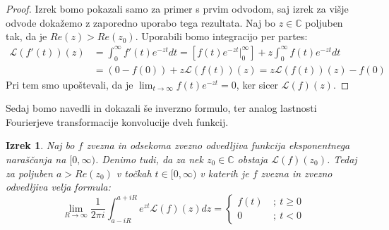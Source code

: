 \documentclass[a4paper, 10pt]{article}
\newtheorem{izr}{Izrek}
\newcommand{\mth}[1]{\ensuremath{\mathbb{#1}}}
\newcommand{\C}{\mth{C}}
\begin{document}
			\begin{proof}
				Izrek bomo pokazali samo za primer s prvim odvodom, saj izrek za višje odvode dokažemo z zaporedno uporabo tega rezultata. Naj bo $z\in\C$ poljuben tak, da je $Re(z) > Re(z_0)$. Uporabili bomo integracijo per partes: \begin{align*}
					\mathcal{L}(f'(t))(z) &= \int_{0}^{\infty}f'(t)e^{-zt}dt = [f(t)e^{-zt} \big|_{0}^{\infty}] + z\int_{0}^{\infty}f(t)e^{-zt}dt \\
					&= (0 - f(0)) + z\mathcal{L}(f(t))(z) = z\mathcal{L}(f(t))(z) - f(0)
				\end{align*}
				Pri tem smo upoštevali, da je $\lim_{t\to\infty}f(t)e^{-zt} = 0$, ker sicer $\mathcal{L}(f)(z)$.
			\end{proof}
			
			Sedaj bomo navedli in dokazali še inverzno formulo, ter analog lastnosti Fourierjeve transformacije konvolucije dveh funkcij.
			
			\begin{izr}
				\label{izr:InvLT}
				Naj bo $f$ zvezna in odsekoma zvezno odvedljiva funkcija eksponentnega naraščanja na $[0, \infty)$. Denimo tudi, da za nek $z_0\in\C$ obstaja $\mathcal{L}(f)(z_0)$. Tedaj za poljuben $a>Re(z_0)$ v točkah $t \in [0, \infty)$ v katerih je $f$ zvezna in zvezno odvedljiva velja formula: $$\lim_{R\to\infty}\frac{1}{2\pi i}\int_{a-iR}^{a+iR}e^{zt}\mathcal{L}(f)(z)dz = \begin{cases}
				f(t)~&;~ t\geq 0 \\
				0~&;~ t < 0
				\end{cases}$$
			\end{izr}
			
\end{document}
